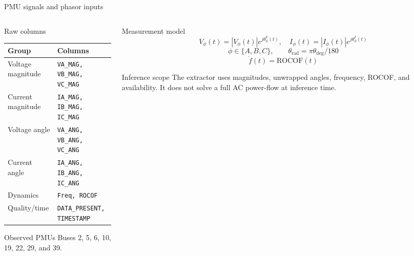 \documentclass[aspectratio=169,10pt,t]{beamer}
\newcommand{\code}[1]{\texttt{\footnotesize #1}}
\begin{document}
\fi
\begin{frame}{PMU signals and phasor inputs}
\small
\begin{columns}[T,totalwidth=\textwidth]
\begin{column}{0.50\textwidth}
\begin{block}{Raw columns}
\scriptsize
\begin{tabular}{ll}
\toprule
Group & Columns\\
\midrule
Voltage magnitude & \code{VA\_MAG, VB\_MAG, VC\_MAG}\\
Current magnitude & \code{IA\_MAG, IB\_MAG, IC\_MAG}\\
Voltage angle & \code{VA\_ANG, VB\_ANG, VC\_ANG}\\
Current angle & \code{IA\_ANG, IB\_ANG, IC\_ANG}\\
Dynamics & \code{Freq, ROCOF}\\
Quality/time & \code{DATA\_PRESENT, TIMESTAMP}\\
\bottomrule
\end{tabular}
\end{block}
\begin{exampleblock}{Observed PMUs}
Buses 2, 5, 6, 10, 19, 22, 29, and 39.
\end{exampleblock}
\end{column}
\begin{column}{0.46\textwidth}
\begin{block}{Measurement model}
\[
V_{\phi}(t)=|V_{\phi}(t)|e^{j\theta^V_{\phi}(t)},\quad
I_{\phi}(t)=|I_{\phi}(t)|e^{j\theta^I_{\phi}(t)}
\]
\[
\phi\in\{A,B,C\},\qquad
\theta_{\mathrm{rad}}=\pi\theta_{\mathrm{deg}}/180
\]
\[
\dot f(t)=\mathrm{ROCOF}(t)
\]
\end{block}
\begin{alertblock}{Inference scope}
The extractor uses magnitudes, unwrapped angles, frequency, ROCOF, and availability. It does not solve a full AC power-flow at inference time.
\end{alertblock}
\end{column}
\end{columns}
\end{frame}
\end{document}

